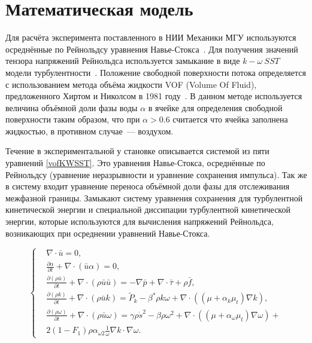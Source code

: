 \documentclass[mathematics,article,accept,pdftex,moreauthors]{Definitions/mdpi}
\begin{document}


\section{Математическая модель}\label{math_model}

Для расчёта эксперимента поставленного в НИИ Механики МГУ используются осреднённые по Рейнольдсу уравнения Навье-Стокса~\cite{Wilcox2006, Hirsch2007,FerzigerPeric2002}. Для получения значений тензора напряжений Рейнольдса используется замыкание в виде $k-\omega\ SST$ модели турбулентности~\cite{Menter1993, Menter1994}. Положение свободной поверхности потока определяется с использованием метода объёма жидкости VOF (Volume Of Fluid), предложенного Хиртом и Николсом в 1981 году~\cite{Hirt1981}. В данном методе используется величина объёмной доли фазы воды $\alpha$ в ячейке для определения свободной поверхности таким образом, что при $\alpha>0.6$ считается что ячейка заполнена жидкостью, в противном случае~--- воздухом.

Течение в экспериментальной у становке описывается системой из пяти уравнений \eqref{vofKWSST}. Это уравнения Навье-Стокса, осреднённые по Рейнольдсу (уравнение неразрывности и уравнение сохранения импульса). Так же в систему входит уравнение переноса объёмной доли фазы для отслеживания межфазной границы. Замыкают систему уравнения сохранения для турбулентной кинетической энергии и специальной диссипации турбулентной кинетической энергии, которые используются для вычисления напряжений Рейнольдса, возникающих при осреднении уравнений Навье-Стокса.
\begin{linenomath} 
\begin{equation}
	\label{vofKWSST}
	\left\{
		\begin{aligned}
			&{\nabla} \cdot \bar{{u}} = 0,\\
			&\frac{\partial \alpha}{\partial t} + {\nabla} \cdot (\bar{{u}} \alpha) = 0,\\
			&\frac{\partial (\rho \bar{{u}})}{\partial t} + {\nabla} \cdot (\rho \bar{{u}} \bar{{u}}) = -{\nabla} \bar{p} + {\nabla} \cdot \bar{{\tau}} + \rho \bar{{f}},\\
			&\frac{\partial (\rho k)}{\partial t} + {\nabla} \cdot (\rho \bar{{u}} k) = \widetilde{P}_k - \beta^*\rho k \omega + {\nabla} \cdot \left( (\mu + \alpha_k \mu_t) {\nabla} k \right),\\
			&\frac{\partial (\rho \omega)}{\partial t}  + {\nabla} \cdot ( \rho \bar{{u}} \omega) = \gamma \rho \dot{s}^2 - \beta \rho \omega^2 + {\nabla} \cdot \left( (\mu + \alpha_\omega \mu_t) {\nabla} \omega \right) + \\
			&2 (1 - F_1) \rho \alpha_{\omega 2} \frac{1}{\omega} {\nabla} k \cdot {\nabla} \omega.
		\end{aligned}
	\right.
\end{equation}
\end{linenomath}
\end{document}
